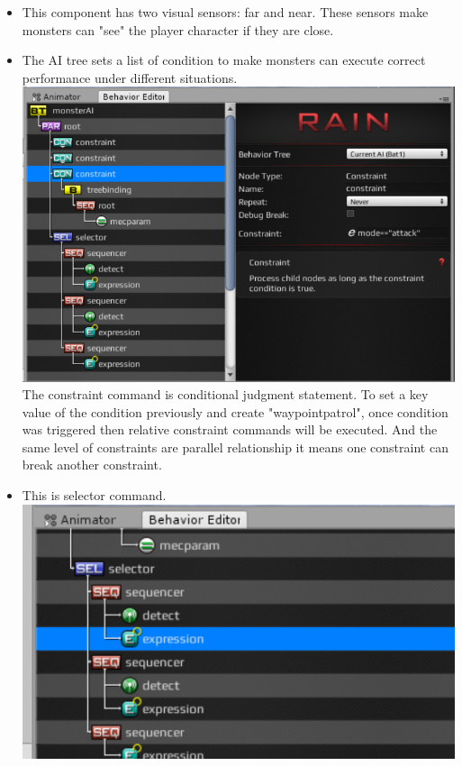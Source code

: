 \begin{itemize}
\item This component has two visual sensors: far and near. These sensors make monsters can "see" the player character if they are close.\\
\item The AI tree sets a list of condition to make monsters can execute correct performance under different situations.\\
\includegraphics[scale=0.5]{img/RainWindows.png}
The constraint command is conditional judgment statement. To set a key value of the condition previously and create "waypointpatrol", once condition was triggered then relative constraint commands will be executed. And the same level of constraints are parallel relationship it means one constraint can break another constraint.\\
\item This is selector command.\\
\includegraphics[scale=0.5]{img/RainSelectE.png}\\

\end{itemize}
